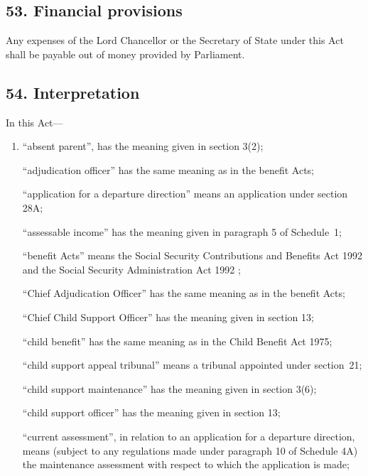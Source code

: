 \documentclass[12pt,a4paper]{article}
\begin{document}
\subsection{53. Financial provisions}

Any expenses of the Lord Chancellor or the Secretary of State under this Act shall be payable out of money provided by Parliament.


\subsection{54. Interpretation}

In this Act—
\begin{enumerate}\item[]
    “absent parent”, has the meaning given in section 3(2);

    “adjudication officer” has the same meaning as in the benefit Acts;

“application for a departure direction” means an application under section 28A;

    “assessable income” has the meaning given in paragraph 5 of Schedule~1;

    “benefit Acts” means the 
Social Security Contributions and Benefits Act 1992 and the Social Security Administration Act 1992%
;

    “Chief Adjudication Officer” has the same meaning as in the benefit Acts;

    “Chief Child Support Officer” has the meaning given in section 13;

    “child benefit” has the same meaning as in the Child Benefit Act 1975;

    “child support appeal tribunal” means a tribunal appointed under section~21;

    “child support maintenance” has the meaning given in section 3(6);

    “child support officer” has the meaning given in section 13;

“current assessment”, in relation to an application for a departure direction, means (subject to any regulations made under paragraph 10 of Schedule 4A) the maintenance assessment with respect to which the application is made;


\end{enumerate}
\end{document}
